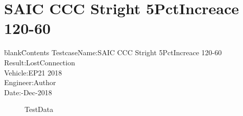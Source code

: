 \documentclass[12pt]{report}
\begin{document}
\section{SAIC CCC Stright 5PctIncreace 120-60} 
\begin{CJK}{GBK}{kai} 
\begin{tabbing} 
\hspace*{40bp}\=blank\hspace*{80bp}\=Contents\kill 
 \>TestcaseName:\>SAIC CCC Stright 5PctIncreace 120-60\\ 
 \>Result:\>LostConnection\\ 
 \>Vehicle:\>EP21 2018\\ 
 \>Engineer:\>Author\\ 
 \>Date:-Dec-2018\\ 
\end{tabbing} 
\end{CJK} 
\label{w3} 
\begin{figure}[h!]  
\centering  
{} 
 
\caption{TestData} 
\end{figure} 
\end{document}
